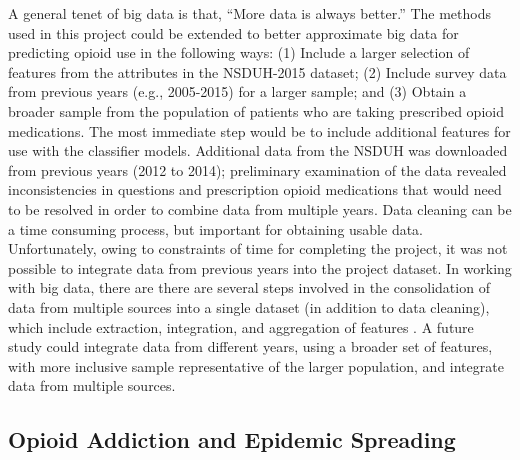 \documentclass[sigconf]{acmart}
\begin{document}
A general tenet of big data is that, ``More data is always better.'' The 
methods used in this project could be extended to better approximate big data 
for predicting opioid use in the following ways: (1) Include a larger 
selection of features from the attributes in the NSDUH-2015 dataset; (2) 
Include survey data from previous years (e.g., 2005-2015) for a larger sample;  
and (3) Obtain a broader sample from the population of patients who are 
taking prescribed opioid medications. The most immediate step would be to 
include additional features for use with the classifier models. Additional 
data from the NSDUH was downloaded from previous years (2012 to 2014); 
preliminary examination of the data revealed inconsistencies in questions 
and prescription opioid medications that would need to be resolved in order 
to combine data from multiple years. Data cleaning can be a time consuming 
process, but important for obtaining usable data. Unfortunately, owing to 
constraints of time for completing the project, it was not possible to
integrate data from previous years into the project dataset. In working with
big data, there are there are several steps involved in the consolidation of 
data from multiple sources into a single dataset (in addition to data 
cleaning), which include extraction, integration, and aggregation of features  
\cite{rahm00}. A future study could integrate data from different years, 
using a broader set of features, with more inclusive sample representative
of the larger population, and integrate data from multiple sources. 

\subsection{Opioid Addiction and Epidemic Spreading}
\end{document}
